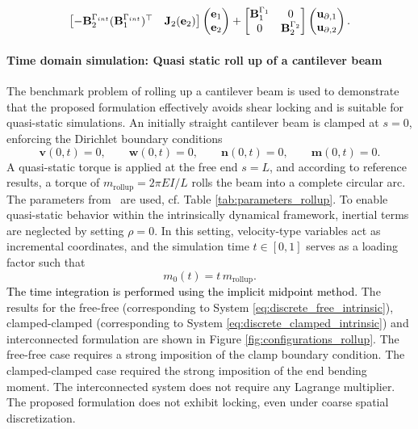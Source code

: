\documentclass[11pt,a4paper]{article}
\newcommand{\revone}[1]{{\textcolor{black}{#1}}}
\begin{document}
{$$\begin{bmatrix}
    - \mathbf{B}_2^{\Gamma_{\rm int}} (\mathbf{B}_1^{\Gamma_{\rm int}})^\top & \mathbf{J}_2(\mathbf{e}_2)
\end{bmatrix}
\begin{pmatrix}
    \mathbf{e}_1 \\
    \mathbf{e}_2 \\
\end{pmatrix} + \begin{bmatrix}
    \mathbf{B}_{1}^{\Gamma_1} & 0 \\
    0 & \mathbf{B}_{2}^{\Gamma_2} \\
\end{bmatrix}
\begin{pmatrix}
    \mathbf{u}_{\partial, 1} \\
    \mathbf{u}_{\partial, 2} \\
\end{pmatrix}.
$$
\paragraph{Time domain simulation: Quasi static roll up of a cantilever beam}
The benchmark problem of rolling up a cantilever beam is used to demonstrate that the proposed formulation effectively avoids shear locking and is suitable for quasi-static simulations. An initially straight cantilever beam is clamped at \(s=0\), enforcing the Dirichlet boundary conditions
\[
\bm{v}(0,t)=0,\qquad \bm{w}(0,t)=0, \qquad \bm{n}(0,t)=0, \qquad \bm{m}(0,t)=0.
\]
A quasi-static torque is applied at the free end \(s=L\), and according to reference results, a torque of \(m_{\text{rollup}} = 2\pi EI / L\) rolls the beam into a complete circular arc. The parameters from~\cite{hante2022} are used, cf. Table \ref{tab:parameters_rollup}. 
To enable quasi-static behavior within the intrinsically dynamical framework, inertial terms are neglected by setting \(\rho = 0\). In this setting, velocity-type variables act as incremental coordinates, and the simulation time \(t \in [0,1]\) serves as a loading factor such that
\[
m_0(t) = t\, m_{\text{rollup}}.
\]
\revone{The time integration is performed using the implicit midpoint method.} The results for the free-free (corresponding to System \eqref{eq:discrete_free_intrinsic}), clamped-clamped (corresponding to System \eqref{eq:discrete_clamped_intrinsic}) and interconnected formulation are shown in Figure \ref{fig:configurations_rollup}. The free-free case requires a strong imposition of the clamp boundary condition. The clamped-clamped case required the strong imposition of the end bending moment. The interconnected system does not require any Lagrange multiplier. The proposed formulation does not exhibit locking, even under coarse spatial discretization.
}
\end{document}
